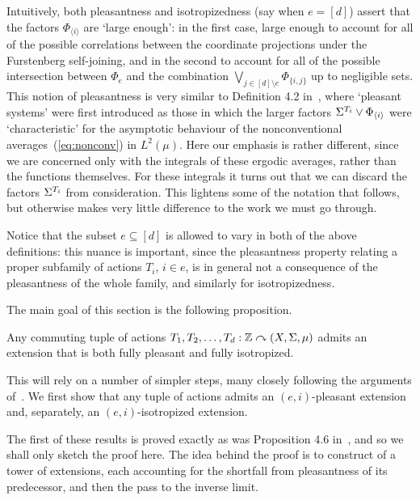 \documentclass[12pt]{article}
\begin{document}
Intuitively, both pleasantness and isotropizedness (say when $e =
[d]$) assert that the factors $\Phi_{\langle i\rangle}$ are `large
enough': in the first case, large enough to account for all of the
possible correlations between the coordinate projections under the
Furstenberg self-joining, and in the second to account for all of
the possible intersection between $\Phi_e$ and the combination
$\bigvee_{j\in[d]\setminus e}\Phi_{\{i,j\}}$ up to negligible sets.
This notion of pleasantness is very similar to Definition 4.2
in~\cite{Aus--nonconv}, where `pleasant systems' were first
introduced as those in which the larger factors $\S^{T_i}\vee
\Phi_{\langle i\rangle}$ were `characteristic' for the asymptotic
behaviour of the nonconventional averages~(\ref{eq:nonconv}) in
$L^2(\mu)$. Here our emphasis is rather different, since we are
concerned only with the integrals of these ergodic averages, rather
than the functions themselves. For these integrals it turns out that
we can discard the factors $\S^{T_i}$ from consideration. This
lightens some of the notation that follows, but otherwise makes very
little difference to the work we must go through.

Notice that the subset $e \subseteq [d]$ is allowed to vary in both
of the above definitions: this nuance is important, since the
pleasantness property relating a proper subfamily of actions $T_i$,
$i \in e$, is in general not a consequence of the pleasantness of
the whole family, and similarly for isotropizedness.

The main goal of this section is the following proposition.

\begin{prop}\label{prop:pleasant-and-isotropized} Any commuting tuple
of actions $T_1,T_2,\ldots,T_d:\bbZ\curvearrowright (X,\S,\mu)$
admits an extension that is both fully pleasant and fully
isotropized.
\end{prop}

This will rely on a number of simpler steps, many closely following
the arguments of~\cite{Aus--nonconv}. We first show that any tuple
of actions admits an $(e,i)$-pleasant extension and, separately, an
$(e,i)$-isotropized extension.

The first of these results is proved exactly as was Proposition 4.6
in~\cite{Aus--nonconv}, and so we shall only sketch the proof here.
The idea behind the proof is to construct of a tower of extensions,
each accounting for the shortfall from pleasantness of its
predecessor, and then the pass to the inverse limit.
\end{document}
